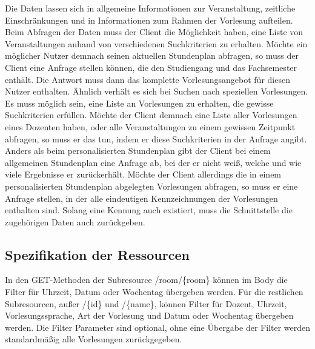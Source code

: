 Die Daten lassen sich in allgemeine Informationen zur Veranstaltung, zeitliche Einschränkungen und in Informationen zum Rahmen der Vorlesung aufteilen. Beim Abfragen der Daten muss der Client die Möglichkeit haben, eine Liste von Veranstaltungen anhand von verschiedenen Suchkriterien zu erhalten. Möchte ein möglicher Nutzer demnach seinen aktuellen Stundenplan abfragen, so muss der Client eine Anfrage stellen können, die den Studiengang und das Fachsemester enthält. Die Antwort muss dann das komplette Vorlesungsangebot für diesen Nutzer enthalten. Ähnlich verhält es sich bei Suchen nach speziellen Vorlesungen. Es muss möglich sein, eine Liste an Vorlesungen zu erhalten, die gewisse Suchkriterien erfüllen. Möchte der Client demnach eine Liste aller Vorlesungen eines Dozenten haben, oder alle Veranstaltungen zu einem gewissen Zeitpunkt abfragen, so muss er das tun, indem er diese Suchkriterien in der Anfrage angibt. 
\\
\linebreak
Anders als beim personalisierten Stundenplan gibt der Client bei einem allgemeinen Stundenplan eine Anfrage ab, bei der er nicht weiß, welche und wie viele Ergebnisse er zurückerhält. Möchte der Client allerdings die in einem personalisierten Stundenplan abgelegten Vorlesungen abfragen, so muss er eine Anfrage stellen, in der alle eindeutigen Kennzeichnungen der Vorlesungen enthalten sind. Solang eine Kennung auch existiert, muss die Schnittstelle die zugehörigen Daten auch zurückgeben.

\subsection*{Spezifikation der Ressourcen}
\label{sec:stundenplan_api}

In den GET-Methoden der Subresource /room/\{room\} können im Body die Filter für Uhrzeit, Datum oder Wochentag übergeben werden. Für die restlichen Subresourcen, außer /\{id\} und /\{name\}, können Filter für Dozent, Uhrzeit, Vorlesungssprache, Art der Vorlesung und Datum oder Wochentag übergeben werden. Die Filter Parameter sind optional, ohne eine Übergabe der Filter werden standardmäßig alle Vorlesungen zurückgegeben.  

